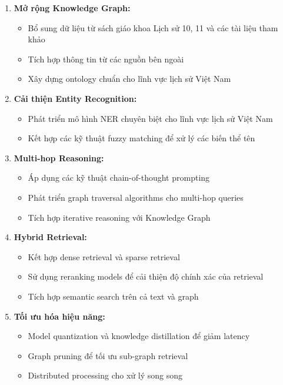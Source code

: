 \begin{enumerate}
    \item \textbf{Mở rộng Knowledge Graph:}
    \begin{itemize}
        \item Bổ sung dữ liệu từ sách giáo khoa Lịch sử 10, 11 và các tài liệu tham khảo
        \item Tích hợp thông tin từ các nguồn bên ngoài
        \item Xây dựng ontology chuẩn cho lĩnh vực lịch sử Việt Nam
    \end{itemize}
    
    \item \textbf{Cải thiện Entity Recognition:}
    \begin{itemize}
        \item Phát triển mô hình NER chuyên biệt cho lĩnh vực lịch sử Việt Nam
        \item Kết hợp các kỹ thuật fuzzy matching để xử lý các biến thể tên
    \end{itemize}
    
    \item \textbf{Multi-hop Reasoning:}
    \begin{itemize}
        \item Áp dụng các kỹ thuật chain-of-thought prompting
        \item Phát triển graph traversal algorithms cho multi-hop queries
        \item Tích hợp iterative reasoning với Knowledge Graph
    \end{itemize}
    
    \item \textbf{Hybrid Retrieval:}
    \begin{itemize}
        \item Kết hợp dense retrieval và sparse retrieval
        \item Sử dụng reranking models để cải thiện độ chính xác của retrieval
        \item Tích hợp semantic search trên cả text và graph
    \end{itemize}
    
    \item \textbf{Tối ưu hóa hiệu năng:}
    \begin{itemize}
        \item Model quantization và knowledge distillation để giảm latency
        \item Graph pruning để tối ưu sub-graph retrieval
        \item Distributed processing cho xử lý song song
    \end{itemize}
    

\end{enumerate}
